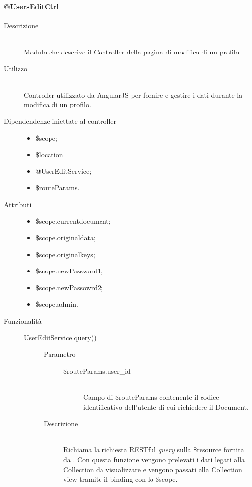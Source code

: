 \paragraph{@UsersEditCtrl}
\begin{description}
 \item[Descrizione] \hfill \\
 Modulo che descrive il Controller della pagina di modifica di un profilo.
 
 \item[Utilizzo] \hfill \\
 Controller utilizzato da AngularJS per fornire e gestire i dati durante la modifica di un profilo.
 
 \item[Dipendendenze iniettate al controller] \hfill
 \begin{itemize}
  \item \$scope;
  \item \$location
  \item @UserEditService;
  \item \$routeParams.
  
 \end{itemize}
 
 \item[Attributi] \hfill
 \begin{itemize}
    \item \$scope.current\textunderscore document;
    \item \$scope.original\textunderscore data;
    \item \$scope.original\textunderscore keys;
    \item \$scope.newPassword1;
    \item \$scope.newPassowrd2;
    \item \$scope.admin.
 \end{itemize}
 
 \item[Funzionalità] \hfill
 \begin{description}
  \item[UserEditService.query()] \hfill
  \begin{description}
  	\item[Parametro] \hfill 
  		\begin{description}
  			\item[\$routeParams.user\_id] \hfill \\
  			Campo di \$routeParams contenente il codice identificativo dell'utente di cui richiedere il Document.
       \end{description}
  	\item[Descrizione] \hfill \\
    Richiama la richiesta RESTful \textit{query} sulla \$resource fornita da .
  Con questa funzione vengono prelevati i dati legati alla Collection da visualizzare e vengono
  passati alla Collection view tramite il binding con lo \$scope. 
  

\end{description}
\end{description}
\end{description}
